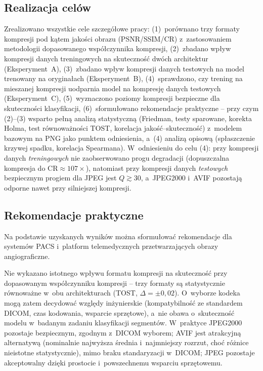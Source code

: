 \documentclass[12pt,a4paper]{article}
\begin{document}
\subsection{Realizacja celów}

Zrealizowano wszystkie cele szczegółowe pracy: (1)~porównano trzy formaty kompresji pod kątem jakości obrazu (PSNR/SSIM/CR) z~zastosowaniem metodologii dopasowanego współczynnika kompresji, (2)~zbadano wpływ kompresji danych treningowych na skuteczność dwóch architektur (Eksperyment~A), (3)~zbadano wpływ kompresji danych testowych na model trenowany na oryginałach (Eksperyment~B), (4)~sprawdzono, czy trening na mieszanej kompresji uodparnia model na kompresję danych testowych (Eksperyment~C), (5)~wyznaczono poziomy kompresji bezpieczne dla skuteczności klasyfikacji, (6)~sformułowano rekomendacje praktyczne -- przy czym (2)--(3) wsparto pełną analizą statystyczną (Friedman, testy sparowane, korekta Holma, test równoważności TOST, korelacja jakość--skuteczność) z~modelem bazowym na PNG jako punktem odniesienia, a~(4) analizą opisową (spłaszczenie krzywej spadku, korelacja Spearmana). W~odniesieniu do celu (4): przy kompresji danych \emph{treningowych} nie zaobserwowano progu degradacji (dopuszczalna kompresja do $\mathrm{CR} \approx 107\times$), natomiast przy kompresji danych \emph{testowych} bezpiecznym progiem dla JPEG jest $Q \gtrsim 30$, a~JPEG2000 i~AVIF pozostają odporne nawet przy silniejszej kompresji.

\subsection{Rekomendacje praktyczne}

Na podstawie uzyskanych wyników można sformułować rekomendacje dla systemów PACS i~platform telemedycznych przetwarzających obrazy angiograficzne.

Nie wykazano istotnego wpływu formatu kompresji na skuteczność przy dopasowanym współczynniku kompresji -- trzy formaty są statystycznie równoważne w~obu architekturach (TOST, $\Delta=\pm 0{,}02$). O~wyborze kodeka mogą zatem decydować względy inżynierskie (kompatybilność ze standardem DICOM, czas kodowania, wsparcie sprzętowe), a~nie obawa o~skuteczność modelu w~badanym zadaniu klasyfikacji segmentów. W~praktyce JPEG2000 pozostaje bezpiecznym, zgodnym z~DICOM wyborem; AVIF jest atrakcyjną alternatywą (nominalnie najwyższa średnia i~najmniejszy rozrzut, choć różnice nieistotne statystycznie), mimo braku standaryzacji w~DICOM; JPEG pozostaje akceptowalny dzięki prostocie i~powszechnemu wsparciu sprzętowemu.
\end{document}

